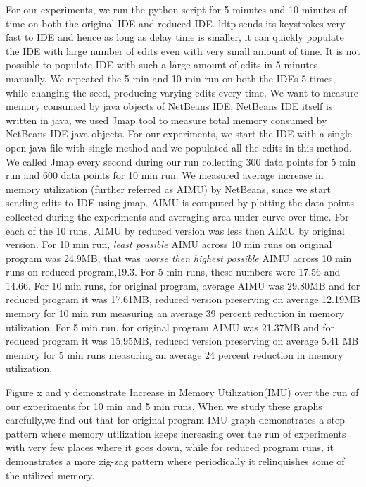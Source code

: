 For our experiments, we run the python script for 5 minutes and 10 minutes of time on both the original IDE and reduced IDE. ldtp sends its keystrokes very fast to IDE and hence as long as delay time is smaller, it can quickly populate the IDE with large number of edits even with very small amount of time. It is not possible to populate IDE with such a large amount of edits in 5 minutes manually. We repeated the 5 min and 10 min run on both the IDEs 5 times, while changing the seed, producing varying edits every time. We want to measure memory consumed by java objects of NetBeans IDE, NetBeans IDE itself is written in java, we used Jmap tool to measure total memory consumed by NetBeans IDE java objects. For our experiments, we start the IDE with a single open java file with single method and we populated all the edits in this method.  We called Jmap every second during our run collecting 300 data points for 5 min run and 600 data points for 10 min run. We measured average increase in memory utilization (further referred as AIMU) by NetBeans, since we start sending edits to IDE using jmap. AIMU is computed by plotting the data points collected during the experiments and averaging area under curve over time. For each of the 10 runs, AIMU by reduced version was less then AIMU by original version. For 10 min run, \emph{least possible} AIMU across 10 min runs on original program was 24.9MB, that was \emph{worse then highest possible} AIMU across 10 min runs on reduced program,19.3. For 5 min runs, these numbers were 17.56 and 14.66.  For 10 min runs, for original program, average AIMU was 29.80MB and for reduced program it was 17.61MB, reduced version preserving on average 12.19MB memory for 10 min run measuring an average 39 percent reduction in memory utilization. For 5 min run, for original program AIMU was 21.37MB and for reduced program it was 15.95MB, reduced version preserving on average 5.41 MB memory for 5 min runs measuring an average 24 percent reduction in memory utilization. 

Figure x and y demonstrate Increase in Memory Utilization(IMU) over the run of our experiments for 10 min and 5 min runs. When we study these graphs carefully,we find out that for original program IMU graph demonstrates a step pattern where memory utilization keeps increasing over the run of experiments with very few places where it goes down, while for reduced program runs, it demonstrates a more zig-zag pattern where periodically it relinquishes some of the utilized memory. 


    



   
 


   

 


